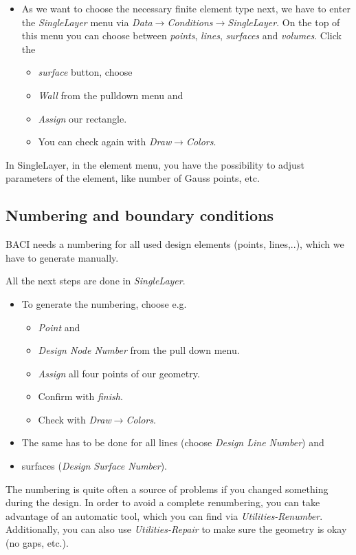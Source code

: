 \begin{itemize}
\item As we want to choose the necessary finite element type next, we have
to enter the \emph{SingleLayer} menu via \emph{Data$\to$Conditions$\to$SingleLayer}.
On the top of this menu you can choose between \emph{points}, \emph{lines},
\emph{surfaces} and \emph{volumes}. Click the 

\begin{itemize}
\item \emph{surface} button, choose 
\item \emph{Wall} from the pulldown menu and 
\item \emph{Assign} our rectangle. 
\item You can check again with \emph{Draw$\to$Colors}.
\end{itemize}
\end{itemize}
In SingleLayer, in the element menu, you have the possibility to adjust
parameters of the element, like number of Gauss points, etc.


\subsection{Numbering and boundary conditions}

BACI needs a numbering for all used design elements (points, lines,..),
which we have to generate manually.

All the next steps are done in \emph{SingleLayer}.

\begin{itemize}
\item To generate the numbering, choose e.g. 

\begin{itemize}
\item \emph{Point} and 
\item \emph{Design Node Number} from the pull down menu. 
\item \emph{Assign} all four points of our geometry.
\item Confirm with \emph{finish}. 
\item Check with \emph{Draw$\to$Colors}. 
\end{itemize}
\item The same has to be done for all lines (choose \emph{Design Line Number})
and 
\item surfaces (\emph{Design Surface Number}).
\end{itemize}
The numbering is quite often a source of problems if you changed something
during the design. In order to avoid a complete renumbering, you can
take advantage of an automatic tool, which you can find via \emph{Utilities-Renumber}.
Additionally, you can also use \emph{Utilities-Repair} to make sure
the geometry is okay (no gaps, etc.).

